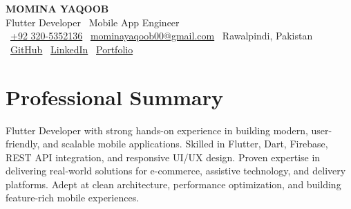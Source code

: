 \documentclass[10pt,a4paper]{article}
\begin{document}
\noindent
\colorbox{darkbg}{%
  \begin{minipage}{\dimexpr\textwidth-2\fboxsep\relax}
    \vspace{12pt}
    \begin{center}
      {\fontsize{24}{28}\selectfont\bfseries\color{white} MOMINA YAQOOB}\\[5pt]
      {\fontsize{12}{15}\selectfont\color{gold} Flutter Developer \textemdash\ Mobile App Engineer}\\[8pt]
      {\footnotesize\color{lightgray}
        \ \href{tel:+923205352136}{+92 320-5352136} \enspace\textbar\enspace
        \ \href{mailto:mominayaqoob00@gmail.com}{mominayaqoob00@gmail.com} \enspace\textbar\enspace
        \ Rawalpindi, Pakistan
      }\\[5pt]
      {\footnotesize\color{lightgray}
        \ \href{https://github.com/momina-yaqoob}{GitHub} \enspace\textbar\enspace
        \ \href{https://www.linkedin.com/in/momina-yaqoob}{LinkedIn} \enspace\textbar\enspace
        \ \href{https://mominayaqoob-portfolio-website.web.app}{Portfolio}
      }
    \end{center}
    \vspace{12pt}
  \end{minipage}%
}

\vspace{8pt}

\section{Professional Summary}
\footnotesize
Flutter Developer with strong hands-on experience in building modern, user-friendly, and scalable mobile
applications. Skilled in Flutter, Dart, Firebase, REST API integration, and responsive UI/UX design. Proven
expertise in delivering real-world solutions for e-commerce, assistive technology, and delivery platforms. Adept
at clean architecture, performance optimization, and building feature-rich mobile experiences.

\end{document}
